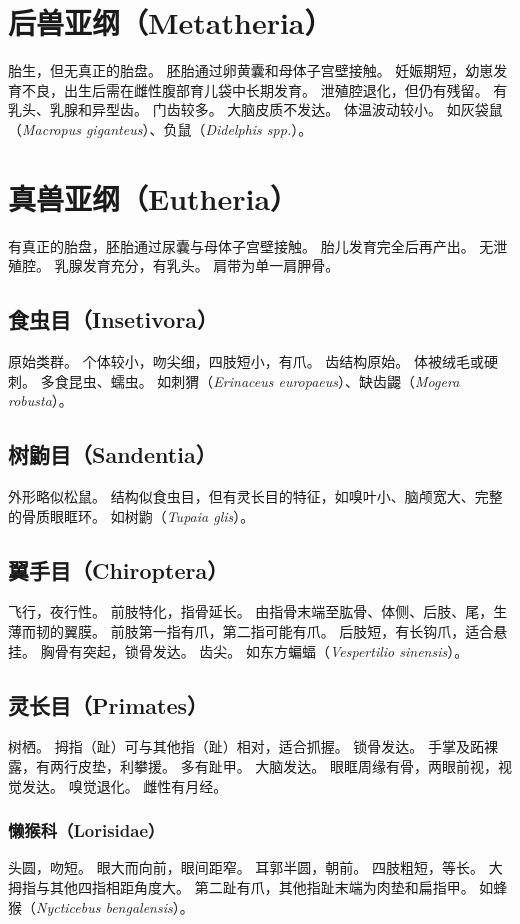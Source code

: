 \documentclass[11pt]{article}
\begin{document}
\section{后兽亚纲（Metatheria）}
胎生，但无真正的胎盘。
胚胎通过卵黄囊和母体子宫壁接触。
妊娠期短，幼崽发育不良，出生后需在雌性腹部育儿袋中长期发育。
泄殖腔退化，但仍有残留。
有乳头、乳腺和异型齿。
门齿较多。
大脑皮质不发达。
体温波动较小。
如灰袋鼠（\textit{Macropus giganteus}）、负鼠（\textit{Didelphis spp.}）。

\section{真兽亚纲（Eutheria）}
有真正的胎盘，胚胎通过尿囊与母体子宫壁接触。
胎儿发育完全后再产出。
无泄殖腔。
乳腺发育充分，有乳头。
肩带为单一肩胛骨。

\subsection{食虫目（Insetivora）}
原始类群。
个体较小，吻尖细，四肢短小，有爪。
齿结构原始。
体被绒毛或硬刺。
多食昆虫、蠕虫。
如刺猬（\textit{Erinaceus europaeus}）、缺齿鼹（\textit{Mogera robusta}）。

\subsection{树鼩目（Sandentia）}
外形略似松鼠。
结构似食虫目，但有灵长目的特征，如嗅叶小、脑颅宽大、完整的骨质眼眶环。
如树鼩（\textit{Tupaia glis}）。

\subsection{翼手目（Chiroptera）}
飞行，夜行性。
前肢特化，指骨延长。
由指骨末端至肱骨、体侧、后肢、尾，生薄而韧的翼膜。
前肢第一指有爪，第二指可能有爪。
后肢短，有长钩爪，适合悬挂。
胸骨有突起，锁骨发达。
齿尖。
如东方蝙蝠（\textit{Vespertilio sinensis}）。

\subsection{灵长目（Primates）}
树栖。
拇指（趾）可与其他指（趾）相对，适合抓握。
锁骨发达。
手掌及跖裸露，有两行皮垫，利攀援。
多有趾甲。
大脑发达。
眼眶周缘有骨，两眼前视，视觉发达。
嗅觉退化。
雌性有月经。

\subsubsection{懒猴科（Lorisidae）}
头圆，吻短。
眼大而向前，眼间距窄。
耳郭半圆，朝前。
四肢粗短，等长。
大拇指与其他四指相距角度大。
第二趾有爪，其他指趾末端为肉垫和扁指甲。
如蜂猴（\textit{Nycticebus bengalensis}）。
\end{document}
